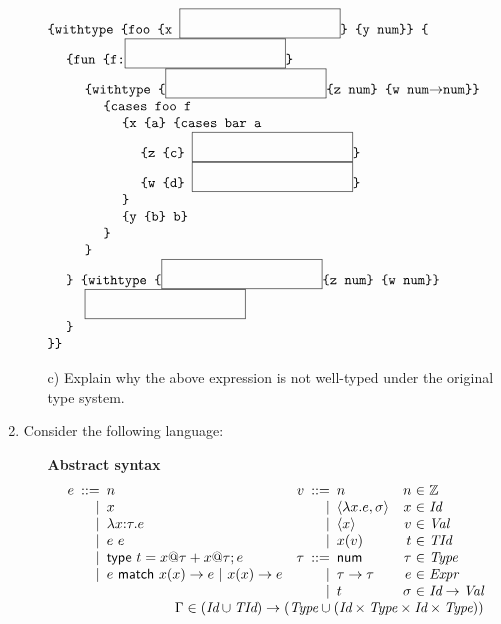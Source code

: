 \begin{enumerate}
\[
\begin{array}{l}
\code{\{withtype \{foo \{x \sblank\} \{y num\}\} \{} \\
~~~~\code{\{fun \{f:\sblank\}} \\
~~~~~~~~\code{\{withtype \{\sblank \{z num\} \{w num$\rightarrow$num\}\}} \\
~~~~~~~~~~~~\code{\{cases foo f} \\
~~~~~~~~~~~~~~~~\code{\{x \{a\} \{cases bar a} \\
~~~~~~~~~~~~~~~~~~~~\code{\{z \{c\} }\sblank\code{\}} \\
~~~~~~~~~~~~~~~~~~~~\code{\{w \{d\} }\sblank\code{\}} \\
~~~~~~~~~~~~~~~~\code{\}} \\
~~~~~~~~~~~~~~~~\code{\{y \{b\} b\}} \\
~~~~~~~~~~~~\code{\}} \\
~~~~~~~~\code{\}} \\
~~~~\code{\} \{withtype \{\sblank \{z num\} \{w num\}\}} \\
~~~~~~~~\sblank \\
~~~~\code{\}} \\
\code{\}\}}
\end{array}
\]

\begin{itemize}
\item[c)] Explain why the above expression is not well-typed under the original type system.
\end{itemize}

\item Consider the following language:
  \begin{itemize}
    \item[] \textbf{Abstract syntax}
  \[
    \begin{array}{
        r@{\hskip5pt}r@{\hskip5pt}l
        r@{\hskip5pt}r@{\hskip5pt}l
        r@{\hskip3pt}r@{\hskip3pt}l
      }
      e &::=& n & v &::=& n & n &\in& \mathbb{Z} \\
      &|& x &&|& \clo{x}{e}{\sigma} & x &\in& \textit{Id} \\
      &|& \lambda x{:}\tau.e &&|& \langle x\rangle & v &\in& \textit{Val} \\
      &|& e\ e &&|& x(v) & t &\in& \textit{TId} \\
      &|& \textsf{type}\ t=x@\tau+x@\tau;e & \tau &::=& \textsf{num} & \tau &\in&
      \textit{Type}\\
      &|& e\ \textsf{match}\ x(x)\rightarrow e\ |\ x(x)\rightarrow e &&|&
      \tau\rightarrow\tau & e &\in& \textit{Expr} \\
      &&&&|& t & \sigma&\in&\textit{Id}\rightarrow\textit{Val} \\
      \multicolumn{9}{r}{
        \Gamma \in (\textit{Id}\cup\textit{TId})\rightarrow
        (\textit{Type}\cup(\textit{Id}\times\textit{Type}\times\textit{Id}\times\textit{Type}))
      }
    \end{array}
  \]


\end{itemize}
\end{enumerate}
